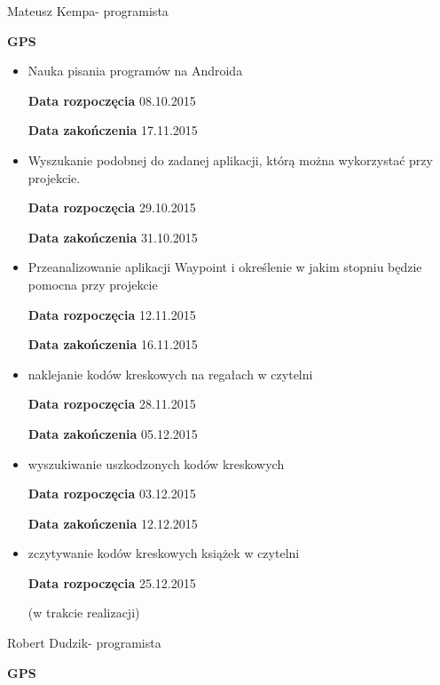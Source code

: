 Mateusz Kempa- programista

\textbf{GPS}
\begin{itemize}
\item Nauka pisania programów na Androida


\textbf{Data rozpoczęcia} 08.10.2015

\textbf{Data zakończenia} 17.11.2015
\item  Wyszukanie podobnej do zadanej aplikacji, którą można wykorzystać przy projekcie.

\textbf{Data rozpoczęcia} 29.10.2015

\textbf{Data zakończenia} 31.10.2015

\item Przeanalizowanie aplikacji Waypoint i określenie w jakim stopniu będzie pomocna przy projekcie

\textbf{Data rozpoczęcia} 12.11.2015

\textbf{Data zakończenia} 16.11.2015

\item naklejanie kodów kreskowych na regałach  w czytelni

\textbf{Data rozpoczęcia} 28.11.2015

\textbf{Data zakończenia} 05.12.2015

\item wyszukiwanie uszkodzonych kodów kreskowych

\textbf{Data rozpoczęcia} 03.12.2015

\textbf{Data zakończenia} 12.12.2015

\item zczytywanie kodów kreskowych książek w czytelni

\textbf{Data rozpoczęcia} 25.12.2015 

(w trakcie realizacji)
 \end{itemize}
 
 
 Robert Dudzik- programista
 
 \textbf{GPS}
 
